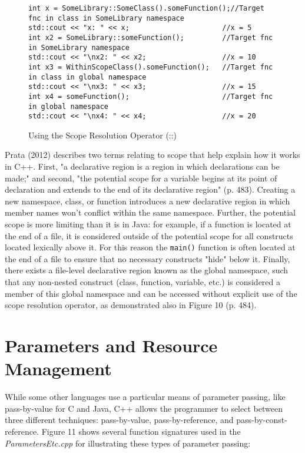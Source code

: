 \documentclass[11pt]{article}
\begin{document}
\begin{figure}[!h]
\centering
\begin{BVerbatim}
int x = SomeLibrary::SomeClass().someFunction();//Target fnc in class in SomeLibrary namespace
std::cout << "x: " << x;                      //x = 5
int x2 = SomeLibrary::someFunction();         //Target fnc in SomeLibrary namespace
std::cout << "\nx2: " << x2;                  //x = 10
int x3 = WithinScopeClass().someFunction();   //Target fnc in class in global namespace
std::cout << "\nx3: " << x3;                  //x = 15
int x4 = someFunction();                      //Target fnc in global namespace
std::cout << "\nx4: " << x4;                  //x = 20
\end{BVerbatim}
\caption{Using the Scope Resolution Operator (::)}
\end{figure} \FloatBarrier

	Prata (2012) describes two terms relating to scope that help explain how it works in C++.  First, "a declarative region is a region in which declarations can be made;" and second, "the potential scope for a variable begins at its point of declaration and extends to the end of its declarative region" (p. 483).  Creating a new namespace, class, or function introduces a new declarative region in which member names won't conflict within the same namespace.  Further, the potential scope is more limiting than it is in Java: for example, if a function is located at the end of a file, it is considered outside of the potential scope for all constructs located lexically above it.  For this reason the \texttt{main()} function is often located at the end of a file to ensure that no necessary constructs "hide" below it.  Finally, there exists a file-level declarative region known as the global namespace, such that any non-nested construct (class, function, variable, etc.) is considered a member of this global namespace and can be accessed without explicit use of the scope resolution operator, as demonstrated also in Figure 10 (p. 484).
	
\section{Parameters and Resource Management}

	While some other languages use a particular means of parameter passing, like pass-by-value for C and Java, C++ allows the programmer to select between three different techniques: pass-by-value, pass-by-reference, and pass-by-const-reference.  Figure 11 shows several function signatures used in the \textit{ParametersEtc.cpp} for illustrating these types of parameter passing:
\end{document}
